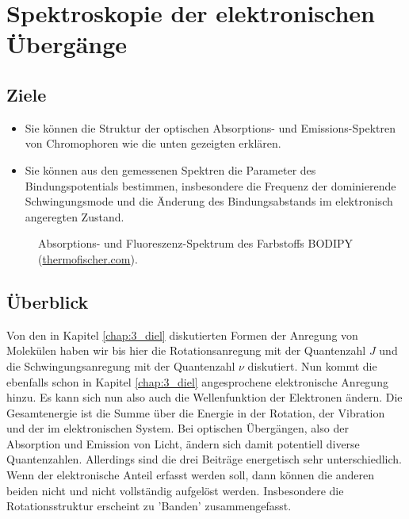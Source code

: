 
\chapter{Spektroskopie der elektronischen Übergänge}





\section{Ziele}

\begin{itemize}
\item Sie können die Struktur der optischen Absorptions- und Emissions-Spektren von Chromophoren wie die unten gezeigten erklären.

\item Sie können aus den gemessenen Spektren die Parameter des Bindungspotentials bestimmen, insbesondere die Frequenz der dominierende Schwingungsmode und die Änderung des Bindungsabstands im elektronisch angeregten Zustand.

\end{itemize}


\begin{figure}
  \caption{Absorptions- und Fluoreszenz-Spektrum des Farbstoffs BODIPY  (\href{https://www.thermofisher.com/de/de/home/life-science/cell-analysis/labeling-chemistry/fluorescence-spectraviewer.html?SID=srch-svtool&UID=10001moh}{thermofischer.com}).}
\end{figure}



\section{Überblick}

Von den in Kapitel \ref{chap:3_diel} diskutierten Formen der Anregung von Molekülen haben wir bis hier die Rotationsanregung mit der Quantenzahl $J$ und die Schwingungsanregung mit der Quantenzahl $\nu$ diskutiert. Nun kommt die ebenfalls schon in Kapitel  \ref{chap:3_diel} angesprochene elektronische Anregung hinzu. Es kann sich nun also auch die Wellenfunktion der Elektronen ändern. Die Gesamtenergie ist die Summe über die Energie in der Rotation, der Vibration und der im elektronischen System. Bei optischen Übergängen, also der Absorption und Emission von Licht, ändern sich damit potentiell diverse Quantenzahlen. Allerdings sind die drei Beiträge energetisch sehr unterschiedlich. Wenn der elektronische Anteil erfasst werden soll, dann können die anderen beiden nicht und nicht vollständig aufgelöst werden. Insbesondere die Rotationsstruktur erscheint zu 'Banden' zusammengefasst.



